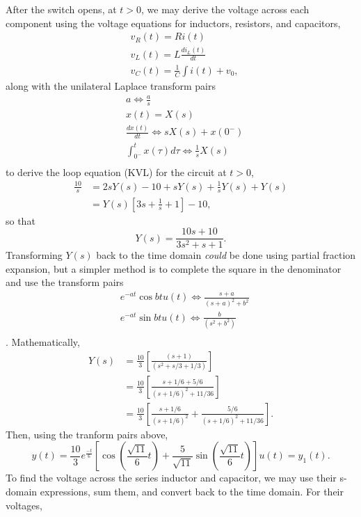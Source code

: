 \documentclass{article}
\begin{document}
\begin{enumerate}[label=\thesubsubsection]
			After the switch opens, at \(t > 0\), we may derive the voltage across each component using the voltage equations for inductors, resistors, and capacitors, 
			\begin{align*}
				&v_R(t) = Ri(t) \\
				&v_L(t) = L \frac{di_L(t)}{dt} \\
				&v_C(t) = \frac{1}{C}\int i(t) + v_0,
			\end{align*}
			along with the unilateral Laplace transform pairs 
			\begin{align*}
				&a \Leftrightarrow \frac{a}{s} \\
				&x(t) = X(s) \\
				&\frac{dx(t)}{dt} \Leftrightarrow sX(s) + x(0^-) \\
				&\int_{0^-}^{t}x(\tau)d\tau \Leftrightarrow \frac{1}{s}X(s) \\
			\end{align*}
			to derive the loop equation (KVL) for the circuit at \(t > 0\),
			\begin{align*}
				\frac{10}{s} &= 2sY(s) - 10 + sY(s) + \frac{1}{s}Y(s) + Y(s) \\
										 &=Y(s) \left[3s + \frac{1}{s} + 1\right] - 10, 
			\end{align*}
			so that 
			\[
				Y(s) = \frac{10s + 10}{3s^2+s+1}.
			\]
			Transforming \(Y(s)\) back to the time domain \textit{could} be done using partial fraction expansion, but a simpler method is to complete the square in the denominator and use the transform pairs
			\begin{align*}
				&e^{-at}\cos{bt}u(t) \Leftrightarrow \frac{s+a}{(s+a)^2+b^2} \\
				&e^{-at}\sin{bt}u(t) \Leftrightarrow \frac{b}{(s^2+b^2)} \\
			\end{align*}.
			Mathematically,
			\begin{align*}
				Y(s) &= \frac{10}{3}\left[\frac{(s+1)}{(s^2+s/3+1/3)}\right]\\
						 &= \frac{10}{3}\left[\frac{s+1/6+5/6}{(s+1/6)^2 + 11/36}\right] \\
						 &= \frac{10}{3}\left[\frac{s+1/6}{(s+1/6)^2} + \frac{5/6}{(s+1/6)^2+11/36}\right].
			\end{align*}
			Then, using the tranform pairs above, 
			\[
				y(t) = \frac{10}{3}e^{\frac{-t}{6}} \left[\cos{(\frac{\sqrt{11}}{6}t)} + \frac{5}{\sqrt{11}}\sin{(\frac{\sqrt{11}}{6}t)}\right]u(t) = y_1(t).
			\]
			To find the voltage across the series inductor and capacitor, we may use their s-domain expressions, sum them, and convert back to the time domain. For their voltages, 

\end{enumerate}
\end{document}
